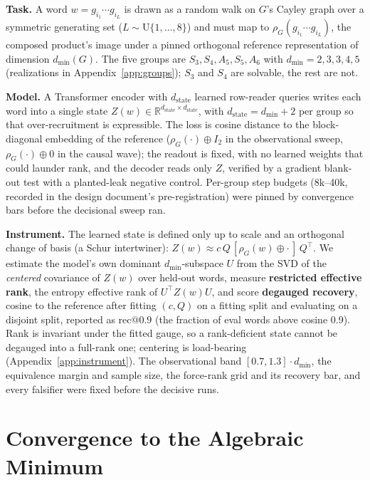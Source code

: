 \documentclass{article}
\makeatletter
\newcommand{\R}{\mathbb{R}}
\newcommand{\dmin}{d_{\min}}
\newcommand{\dstate}{d_{\mathrm{state}}}
\newcommand{\recninety}{\mathrm{rec}@0.9}
\makeatother
\begin{document}
\textbf{Task.} A word $w = g_{i_1} \cdots g_{i_L}$ is drawn as a random
walk on $G$'s Cayley graph over a symmetric generating set
($L \sim \mathrm{U}\{1,\dots,8\}$) and must map to
$\rho_G(g_{i_1} \cdots g_{i_L})$, the composed product's image under a
pinned orthogonal reference representation of dimension $\dmin(G)$. The
five groups are $S_3, S_4, A_5, S_5, A_6$ with $\dmin = 2, 3, 3, 4, 5$
(realizations in Appendix~\ref{app:groups}); $S_3$ and $S_4$ are
solvable, the rest are not.

\textbf{Model.} A Transformer encoder with $\dstate$ learned row-reader
queries writes each word into a single state
$Z(w) \in \R^{\dstate \times \dstate}$, with $\dstate = \dmin + 2$ per
group so that over-recruitment is expressible. The loss is cosine
distance to the block-diagonal embedding of the reference
($\rho_G(\cdot) \oplus I_2$ in the observational sweep,
$\rho_G(\cdot) \oplus 0$ in the causal wave); the readout is fixed, with
no learned weights that could launder rank, and the decoder reads only
$Z$, verified by a gradient blank-out test with a planted-leak negative
control. Per-group step budgets (8k--40k, recorded in the design
document's pre-registration) were pinned by convergence bars before the
decisional sweep ran.

\textbf{Instrument.} The learned state is defined only up to scale and
an orthogonal change of basis (a Schur intertwiner):
$Z(w) \approx c\,Q\,[\rho_G(w) \oplus \cdot\,]\,Q^{\top}$. We estimate
the model's own dominant $\dmin$-subspace $U$ from the SVD of the
\emph{centered} covariance of $Z(w)$ over held-out words, measure
\textbf{restricted effective rank}, the entropy effective rank of
$U^{\top} Z(w) U$, and score \textbf{degauged recovery}, cosine to the
reference after fitting $(c, Q)$ on a fitting split and evaluating on a
disjoint split, reported as $\recninety$ (the fraction of eval words
above cosine 0.9). Rank is invariant under the fitted gauge, so a
rank-deficient state cannot be degauged into a full-rank one; centering
is load-bearing (Appendix~\ref{app:instrument}). The observational band
$[0.7, 1.3] \cdot \dmin$, the equivalence margin and sample size, the
force-rank grid and its recovery bar, and every falsifier were fixed
before the decisive runs.

\section{Convergence to the Algebraic Minimum}
\label{sec:convergence}
\end{document}
